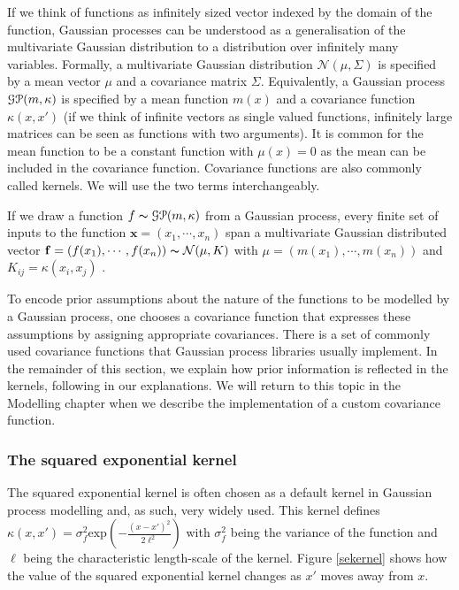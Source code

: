 \documentclass[a4paper,12pt,twoside,openright]{report}
\begin{document}
If we think of functions as infinitely sized vector indexed by the domain of the function, Gaussian processes can be understood as a generalisation of the multivariate Gaussian distribution to a distribution over infinitely many variables. Formally, a multivariate Gaussian distribution $\mathcal{N}(\mu, \Sigma)$ is specified by a mean vector $\mu$ and a covariance matrix $\Sigma$. Equivalently, a Gaussian process $\EuScript{G}\EuScript{P}(m, \kappa)$ is specified by a mean function $m(x)$ and a covariance function $\kappa(x, x')$ (if we think of infinite vectors as single valued functions, infinitely large matrices can be seen as functions with two arguments). It is common for the mean function to be a constant function with $\mu(x) = 0$ as the mean can be included in the covariance function. Covariance functions are also commonly called kernels. We will use the two terms interchangeably.

If we draw a function $f \thicksim \EuScript{G}\EuScript{P}(m, \kappa)$ from a Gaussian process, every finite set of inputs to the function $\mathbf{x} = (x_1, \cdots, x_n)$ span a multivariate Gaussian distributed vector $\mathbf{f} = (f(x_1), \cdots, f(x_n)) \thicksim \mathcal{N}(\mu,K)$ with $\mu = (m(x_1), \cdots, m(x_n))$ and $K_{ij} = \kappa(x_i, x_j)$ \cite{Rasmussen:2005:GPM:1162254}.

To encode prior assumptions about the nature of the functions to be modelled by a Gaussian process, one chooses a covariance function that expresses these assumptions by assigning appropriate covariances. There is a set of commonly used covariance functions that Gaussian process libraries usually implement. In the remainder of this section, we explain how prior information is reflected in the kernels, following \cite{duvenaudthesis} in our explanations. We will return to this topic in the Modelling chapter when we describe the implementation of a custom covariance function. 

\subsubsection{The squared exponential kernel}
The squared exponential kernel is often chosen as a default kernel in Gaussian process modelling and, as such, very widely used. This kernel defines $\kappa(x, x') = \sigma_f^2 \text{exp}(-\frac{(x-x')^2}{2\ell^2})$ with $\sigma_f^2$ being the variance of the function and $\ell$ being the characteristic length-scale of the kernel. Figure \ref{sekernel} shows how the value of the squared exponential kernel changes as $x'$ moves away from $x$. 
\end{document}
